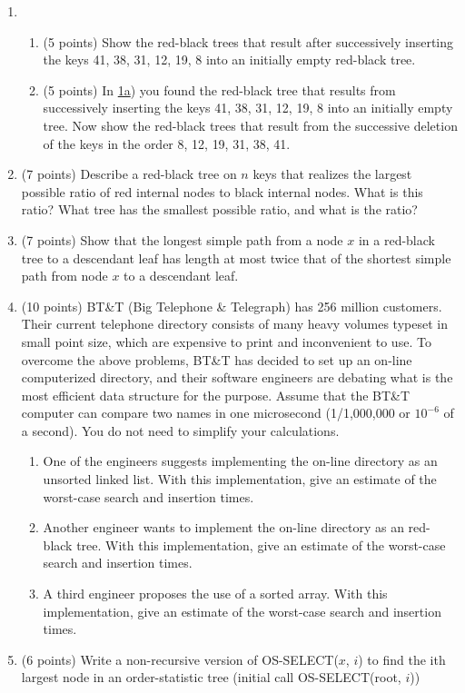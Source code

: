 \documentclass[12pt]{report}
\begin{document}
\maketitle

\begin{enumerate}[label=\arabic*.]
	\item
    \begin{enumerate}[label=\arabic{enumi}\alph*)]
        \item\label{prb:1a} (5 points) Show the red-black trees that result after successively inserting the keys 41, 38, 31, 12, 19, 8 into an initially empty red-black tree.
		\item (5 points) In \hyperref[prb:1a]{1a}) you found the red-black tree that results from successively inserting the keys 41, 38, 31, 12, 19, 8 into an initially empty tree. Now show the red-black trees that result from the successive deletion of the keys in the order 8, 12, 19, 31, 38, 41.
    \end{enumerate}
	\setcounter{enumi}{1}
	\item (7 points) Describe a red-black tree on $n$ keys that realizes the largest possible ratio of red internal nodes to black internal nodes. What is this ratio? What tree has the smallest possible ratio, and what is the ratio?
	\item (7 points) Show that the longest simple path from a node $x$ in a red-black tree to a descendant leaf has length at most twice that of the shortest simple path from node $x$ to a descendant leaf.
	\item (10 points) BT\&T (Big Telephone \& Telegraph) has 256 million customers. Their current telephone directory consists of many heavy volumes typeset in small point size, which are expensive to print and inconvenient to use. To overcome the above problems, BT\&T has decided to set up an on-line computerized directory, and their software engineers are debating what is the most efficient data structure for the purpose. Assume that the BT\&T computer can compare two names in one microsecond (1/1,000,000 or $10^{-6}$ of a second). You do not need to simplify your calculations.
	\begin{enumerate}[label=\arabic{enumi}\alph*)]
	    \item One of the engineers suggests implementing the on-line directory as an unsorted linked list. With this implementation, give an estimate of the worst-case search and insertion times.
		\item Another engineer wants to implement the on-line directory as an red-black tree. With this implementation, give an estimate of the worst-case search and insertion times.
		\item A third engineer proposes the use of a sorted array. With this implementation, give an estimate of the worst-case search and insertion times.
	\end{enumerate}
	\item (6 points) Write a non-recursive version of OS-SELECT($x$, $i$) to find the ith largest node in an order-statistic tree (initial call OS-SELECT(root, $i$))
\end{enumerate}
\end{document}

